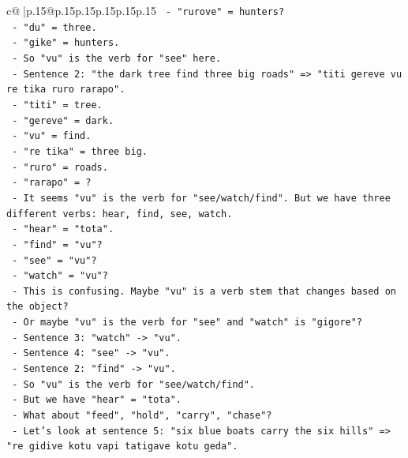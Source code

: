 \documentclass{article}
\begin{document}
{\begin{supertabular}{c@{$\;$}|p{.15\linewidth}@{}p{.15\linewidth}p{.15\linewidth}p{.15\linewidth}p{.15\linewidth}p{.15\linewidth}}
{{{\texttt{              {-} "rurove" = hunters?} \\
\texttt{              {-} "du" = three.} \\
\texttt{              {-} "gike" = hunters.} \\
\texttt{              {-} So "vu" is the verb for "see" here.} \\
\texttt{            {-} Sentence 2: "the dark tree find three big roads" => "titi gereve vu re tika ruro rarapo".} \\
\texttt{              {-} "titi" = tree.} \\
\texttt{              {-} "gereve" = dark.} \\
\texttt{              {-} "vu" = find.} \\
\texttt{              {-} "re tika" = three big.} \\
\texttt{              {-} "ruro" = roads.} \\
\texttt{              {-} "rarapo" = ?} \\
\texttt{            {-} It seems "vu" is the verb for "see/watch/find". But we have three different verbs: hear, find, see, watch.} \\
\texttt{            {-} "hear" = "tota".} \\
\texttt{            {-} "find" = "vu"?} \\
\texttt{            {-} "see" = "vu"?} \\
\texttt{            {-} "watch" = "vu"?} \\
\texttt{            {-} This is confusing. Maybe "vu" is a verb stem that changes based on the object?} \\
\texttt{            {-} Or maybe "vu" is the verb for "see" and "watch" is "gigore"?} \\
\texttt{            {-} Sentence 3: "watch" {-}> "vu".} \\
\texttt{            {-} Sentence 4: "see" {-}> "vu".} \\
\texttt{            {-} Sentence 2: "find" {-}> "vu".} \\
\texttt{            {-} So "vu" is the verb for "see/watch/find".} \\
\texttt{            {-} But we have "hear" = "tota".} \\
\texttt{            {-} What about "feed", "hold", "carry", "chase"?} \\
\texttt{            {-} Let's look at sentence 5: "six blue boats carry the six hills" => "re gidive kotu vapi tatigave kotu geda".} \\
}}}
\end{supertabular}}
\end{document}
